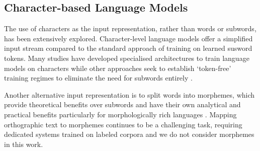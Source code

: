 
\subsection{Character-based Language Models}

The use of characters as the input representation, rather than words or subwords, has been extensively explored. Character-level language models offer a simplified input stream compared to the standard approach of training on learned susword tokens. Many studies have developed specialised architectures to train language models on characters \citep{jozefowicz2016exploringlimitslanguagemodeling, kim2016character, ma-etal-2020-charbert, al-rfou_character-level_2019} while other approaches seek to establish `token-free' training regimes to eliminate the need for subwords entirely \citep{clark-etal-2022-canine, xue-2022-byt5}.

Another alternative input representation is to split words into morphemes, which provide theoretical benefits over subwords and have their own analytical and practical benefits particularly for morphologically rich languages \citep{ustun-etal-2018-characters, nzeyimana-niyongabo-rubungo-2022-kinyabert, fan-sun-2023-constructivist}. Mapping orthographic text to morphemes continues to be a challenging task, requiring dedicated systems trained on labeled corpora \citep{batsuren-etal-2022-sigmorphon} and we do not consider morphemes in this work.

